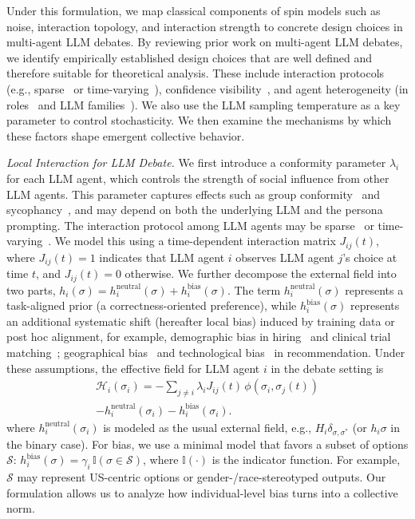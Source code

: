 \documentclass{article}
\theoremstyle{plain}
\theoremstyle{definition}
\theoremstyle{remark}
\begin{document}
Under this formulation, we map classical components of spin models such as noise, 
interaction topology, and interaction strength to concrete design choices in multi-agent LLM debates. 
By reviewing prior work on multi-agent LLM debates, we identify empirically established design choices that are well defined and therefore suitable for theoretical analysis. These include interaction protocols (e.g., sparse~\cite{li-etal-2024-improving-multi} or time-varying~\cite{chen2023agentverse}), confidence visibility~\cite{eo2025debate}, and agent heterogeneity (in roles~\cite{liang2023encouraging,chen2023agentverse} and LLM families~\cite{chen2024reconcile,eo2025debate}). 
We also use the LLM sampling temperature as a key parameter to control stochasticity. 
We then examine the mechanisms by which these factors shape emergent collective behavior. 


{\sl Local Interaction for LLM Debate. }
We first introduce a conformity parameter $\lambda_i$ for each LLM agent, which controls the strength of social influence from other LLM agents.
This parameter captures effects such as group conformity~\cite{choi2025empirical} and sycophancy~\cite{zheng2023judging}, and may depend on both the underlying LLM and the persona prompting.
The interaction protocol among LLM agents may be sparse~\cite{li-etal-2024-improving-multi} or time-varying~\cite{chen2023agentverse}.
We model this using a time-dependent interaction matrix $J_{ij}(t)$, where $J_{ij}(t)=1$ indicates that LLM agent $i$ observes LLM agent $j$'s choice at time $t$, and $J_{ij}(t)=0$ otherwise. 
We further decompose the external field into two parts,
\(
h_i(\sigma)=h_i^{\mathrm{neutral}}(\sigma)+h_i^{\mathrm{bias}}(\sigma).
\)
The term \(h_i^{\mathrm{neutral}}(\sigma)\) represents a task-aligned prior (a correctness-oriented preference),
while \(h_i^{\mathrm{bias}}(\sigma)\) represents an additional systematic shift (hereafter local bias) induced by training data or post hoc alignment, for example,  
demographic bias in hiring~\cite{wilson2025gender} and clinical trial matching~\cite{ji2025mitigating}; geographical bias~\cite{manvi2024geographical} and technological bias~\cite{winder2025biased} in recommendation.  
Under these assumptions, the effective field for LLM agent $i$ in the debate setting is
\begin{align}\label{eq:llm-effective-field}
\mathcal{H}_i(\sigma_i)
= - \sum_{j \neq i} \lambda_i J_{ij}(t)\, \phi\!\left(\sigma_i, \sigma_j(t)\right) \\ \nonumber
- h_i^{\mathrm{neutral}}(\sigma_i) - h_i^{\mathrm{bias}}(\sigma_i).
\end{align}
where \(h_i^{\mathrm{neutral}}(\sigma_i)\) is modeled as the usual external field, e.g.,
\(H_i \delta_{\sigma,\sigma^\ast}\) (or \(h_i \sigma\) in the binary case). 
For bias, we use a minimal model that favors a subset of options \(\mathcal{S}\):
$h_i^{\mathrm{bias}}(\sigma)=\gamma_i\,\mathbb{I}(\sigma\in\mathcal{S})$, where $\mathbb{I}(\cdot)$ is the indicator function. 
For example, $\mathcal{S}$ may represent US-centric options or gender-/race-stereotyped outputs. 
Our formulation allows us to analyze how individual-level bias turns into a collective norm. 
\end{document}
